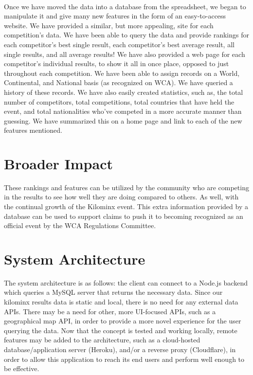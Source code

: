 \documentclass[12pt]{article}
\begin{document}
		\paragraph*{}
			Once we have moved the data into a database from the spreadsheet, we began to manipulate it and give many new features in the form of an easy-to-access website. We have provided a similar, but more appealing, site for each competition’s data. We have been able to query the data and provide rankings for each competitor’s best single result, each competitor’s best average result, all single results, and all average results! We have also provided a web page for each competitor’s individual results, to show it all in once place, opposed to just throughout each competition. We have been able to assign records on a World, Continental, and National basis (as recognized on WCA). We have queried a history of these records. We have also easily created statistics, such as, the total number of competitors, total competitions, total countries that have held the event, and total nationalities who’ve competed in a more accurate manner than guessing. We have summarized this on a home page and link to each of the new features mentioned.

	\section{Broader Impact}
		\paragraph*{}
			These rankings and features can be utilized by the community who are competing in the results to see how well they are doing compared to others. As well, with the continual growth of the Kilominx event. This extra information provided by a database can be used to support claims to push it to becoming recognized as an official event by the WCA Regulations Committee.

	\section{System Architecture}
		\paragraph*{}
			The system architecture is as follows: the client can connect to a Node.js backend which queries a MySQL server that returns the necessary data. Since our kilominx results data is static and local, there is no need for any external data APIs. There may be a need for other, more UI-focused APIs, such as a geographical map API, in order to provide a more novel experience for the user querying the data. Now that the concept is tested and working locally, remote features may be added to the architecture, such as a cloud-hosted database/application server (Heroku), and/or a reverse proxy (Cloudflare), in order to allow this application to reach its end users and perform well enough to be effective. 
\end{document}

